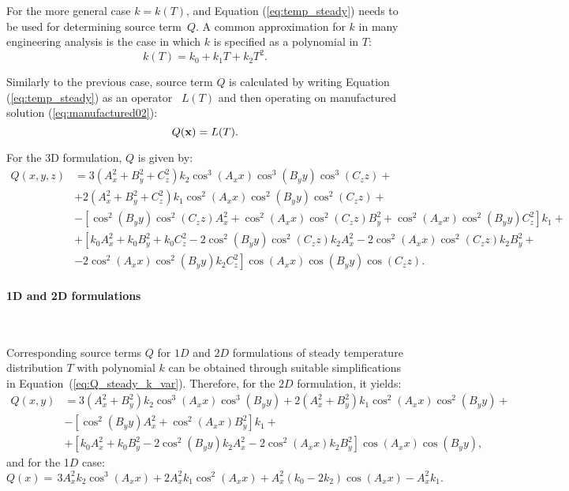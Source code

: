 \documentclass[a4paper,10pt]{article}
\begin{document}
For the more general case $k = k (T )$, and Equation (\ref{eq:temp_steady}) needs to be used for determining
source term~$Q$. A common approximation for $k$ in many engineering analysis is the case in which $k$ is specified as a polynomial in $T$:
\begin{equation}
k(T)= k_0 + k_1 T +  k_2 T^2.
\end{equation}


Similarly to the previous case, source term $Q$ is calculated by  writing Equation (\ref{eq:temp_steady}) as an operator~ $L(T)$ and then operating on manufactured solution (\ref{eq:manufactured02}):
$$Q({\bf x}) = L(T).$$

For the 3D formulation, $Q$ is given by:
\begin{equation}\label{eq:Q_steady_k_var}
\begin{split}
  Q(x,y,z) &= 3 (A_x^2+B_y^2+C_z^2) k_2 \cos^3(A_x x) \cos^3(B_y y) \cos^3(C_z z)+\\
    &+2 (A_x^2+B_y^2+C_z^2) k_1 \cos^2(A_x x) \cos^2(B_y y) \cos^2(C_z z) +\\
    &-\left[\cos^2(B_y y) \cos^2(C_z z) A_x^2+\cos^2(A_x x) \cos^2(C_z z) B_y^2+\cos^2(A_x x) \cos^2(B_y y) C_z^2 \right] k_1+\\
    &+\left[k_0 A_x^2+k_0 B_y^2+k_0 C_z^2 -2 \cos^2(B_y y) \cos^2(C_z z) k_2 A_x^2-2 \cos^2(A_x x) \cos^2(C_z z) k_2 B_y^2+\right.\\
      &-\left.2 \cos^2(A_x x) \cos^2(B_y y) k_2 C_z^2 \right] \cos(A_x x) \cos(B_y y) \cos(C_z z).
\end{split}
\end{equation}


\paragraph{1D and 2D formulations}\

Corresponding source terms $Q$ for $1D$ and $2D$ formulations of steady temperature distribution $T$ with polynomial
$k$ can be obtained through suitable simplifications in Equation~(\ref{eq:Q_steady_k_var}). Therefore, for the $2D$ formulation, it yields:
\begin{equation*}
\begin{split}
Q(x,y)  &= 3 (A_x^2+B_y^2) k_2 \cos^3(A_x x) \cos^3(B_y y)+
   2 (A_x^2+B_y^2) k_1 \cos^2(A_x x) \cos^2(B_y y) +\\
  &-[\cos^2(B_y y) A_x^2+\cos^2(A_x x) B_y^2] k_1+\\
  &+[k_0 A_x^2+k_0 B_y^2-2 \cos^2(B_y y) k_2 A_x^2-2 \cos^2(A_x x) k_2 B_y^2] \cos(A_x x) \cos(B_y y),
\end{split}
\end{equation*}
%
and for the 1$D$ case:
$$
\displaystyle Q ( x ) = \,3 A_x^2 k_2  \cos^3 ( A_{x}  x )   +2 A_x^2 k_1  \cos^2( A_{x}  x )+
A_x^2 ( k_0-  2 k_2 )  \cos ( A_{x}  x ) -  A_x^2 k_1.
$$
\end{document}
